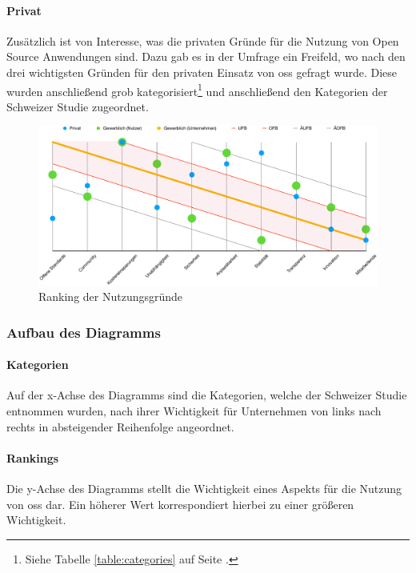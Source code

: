 \documentclass[a4paper]{article}
\begin{document}
            \paragraph{Privat}
                Zusätzlich ist von Interesse, was die privaten Gründe für die Nutzung von Open Source Anwendungen sind. Dazu gab es in der Umfrage ein Freifeld, wo nach den drei wichtigsten Gründen für den privaten Einsatz von \gls{oss} gefragt wurde. Diese wurden anschließend grob kategorisiert\footnote{Siehe Tabelle \ref{table:categories} auf Seite \pageref{table:categories}.} und anschließend den Kategorien der Schweizer Studie zugeordnet.
                
            \begin{figure}
                \includegraphics[width=\textwidth]{assets/results/commercialReasoning/usageReasonRanking}
                \caption{Ranking der Nutzungsgründe}
                \label{table:usageRanking}
            \end{figure}
                
            \subsubsection{Aufbau des Diagramms}
                \paragraph{Kategorien}
                    Auf der x-Achse des Diagramms sind die Kategorien, welche der Schweizer Studie entnommen wurden, nach ihrer Wichtigkeit für Unternehmen von links nach rechts in absteigender Reihenfolge angeordnet.
                    
                \paragraph{Rankings}
                    Die y-Achse des Diagramms stellt die Wichtigkeit eines Aspekts für die Nutzung von \gls{oss} dar. Ein höherer Wert korrespondiert hierbei zu einer größeren Wichtigkeit.
                    
\end{document}
